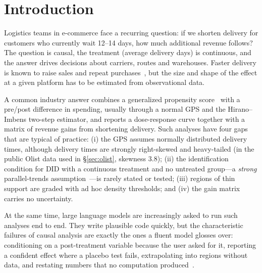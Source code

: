 \documentclass[sigconf,anonymous,review]{acmart}
\begin{document}
\maketitle

\section{Introduction}

Logistics teams in e-commerce face a recurring question: if we shorten delivery for customers who currently wait 12--14 days, how much additional revenue follows? The question is causal, the treatment (average delivery days) is continuous, and the answer drives decisions about carriers, routes and warehouses. Faster delivery is known to raise sales and repeat purchases~\cite{fisher2019value,rao2011failure}, but the size and shape of the effect at a given platform has to be estimated from observational data.

A common industry answer combines a generalized propensity score~\cite{hirano2004propensity,imai2004causal} with a pre/post difference in spending, usually through a normal GPS and the Hirano--Imbens two-step estimator, and reports a dose-response curve together with a matrix of revenue gains from shortening delivery. Such analyses have four gaps that are typical of practice: (i) the GPS assumes normally distributed delivery times, although delivery times are strongly right-skewed and heavy-tailed (in the public Olist data used in \S\ref{sec:olist}, skewness 3.8); (ii) the identification condition for DID with a continuous treatment and no untreated group---a \emph{strong} parallel-trends assumption~\cite{callaway2024difference}---is rarely stated or tested; (iii) regions of thin support are graded with ad hoc density thresholds; and (iv) the gain matrix carries no uncertainty.

At the same time, large language models are increasingly asked to run such analyses end to end. They write plausible code quickly, but the characteristic failures of causal analysis are exactly the ones a fluent model glosses over: conditioning on a post-treatment variable because the user asked for it, reporting a confident effect where a placebo test fails, extrapolating into regions without data, and restating numbers that no computation produced~\cite{ji2023survey,zecevic2023causal}.
\end{document}
